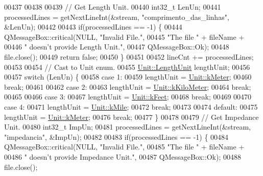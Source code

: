 \begin{DoxyCode}
00437 
00438 
00439   \textcolor{comment}{// Get Length Unit.}
00440   int32\_t LenUn;
00441   processedLines = getNextLineInt(&stream, \textcolor{stringliteral}{"comprimento\_das\_linhas"}, &LenUn);
00442 
00443   \textcolor{keywordflow}{if}(processedLines == -1) \{
00444     QMessageBox::critical(NULL, \textcolor{stringliteral}{"Invalid File."},
00445                           \textcolor{stringliteral}{"The file "} + fileName +
00446                           \textcolor{stringliteral}{" doesn't provide Length Unit."},
00447                           QMessageBox::Ok);
00448     file.close();
00449     \textcolor{keywordflow}{return} \textcolor{keyword}{false};
00450   \}
00451 
00452   lineCnt += processedLines;
00453 
00454   \textcolor{comment}{// Cast to Unit enum.}
00455   \hyperlink{class_unit_a8c8921f7b225ad6063b1cb573425b9a0}{Unit::LengthUnit} lengthUnit;
00456 
00457   \textcolor{keywordflow}{switch} (LenUn) \{
00458   \textcolor{keywordflow}{case} 1:
00459     lengthUnit = \hyperlink{class_unit_a8c8921f7b225ad6063b1cb573425b9a0abfa41ebe7ee649a1f02c9b8ae570434b}{Unit::kMeter};
00460     \textcolor{keywordflow}{break};
00461 
00462   \textcolor{keywordflow}{case} 2:
00463     lengthUnit = \hyperlink{class_unit_a8c8921f7b225ad6063b1cb573425b9a0a1c04f3dd196dbe1832a2658215b0d919}{Unit::kKiloMeter};
00464     \textcolor{keywordflow}{break};
00465 
00466   \textcolor{keywordflow}{case} 3:
00467     lengthUnit = \hyperlink{class_unit_a8c8921f7b225ad6063b1cb573425b9a0a9ac9b167b0ebce477fb53d6ace04ddc8}{Unit::kFeet};
00468     \textcolor{keywordflow}{break};
00469 
00470   \textcolor{keywordflow}{case} 4:
00471     lengthUnit = \hyperlink{class_unit_a8c8921f7b225ad6063b1cb573425b9a0a2ebde742068bbee0510de32fbb4cd724}{Unit::kMile};
00472     \textcolor{keywordflow}{break};
00473 
00474   \textcolor{keywordflow}{default}:
00475     lengthUnit = \hyperlink{class_unit_a8c8921f7b225ad6063b1cb573425b9a0abfa41ebe7ee649a1f02c9b8ae570434b}{Unit::kMeter};
00476     \textcolor{keywordflow}{break};
00477   \}
00478 
00479   \textcolor{comment}{// Get Impedance Unit.}
00480   int32\_t ImpUn;
00481   processedLines = getNextLineInt(&stream, \textcolor{stringliteral}{"impedancia"}, &ImpUn);
00482 
00483   \textcolor{keywordflow}{if}(processedLines == -1) \{
00484     QMessageBox::critical(NULL, \textcolor{stringliteral}{"Invalid File."},
00485                           \textcolor{stringliteral}{"The file "} + fileName +
00486                           \textcolor{stringliteral}{" doesn't provide Impedance Unit."},
00487                           QMessageBox::Ok);
00488     file.close();

\end{DoxyCode}

